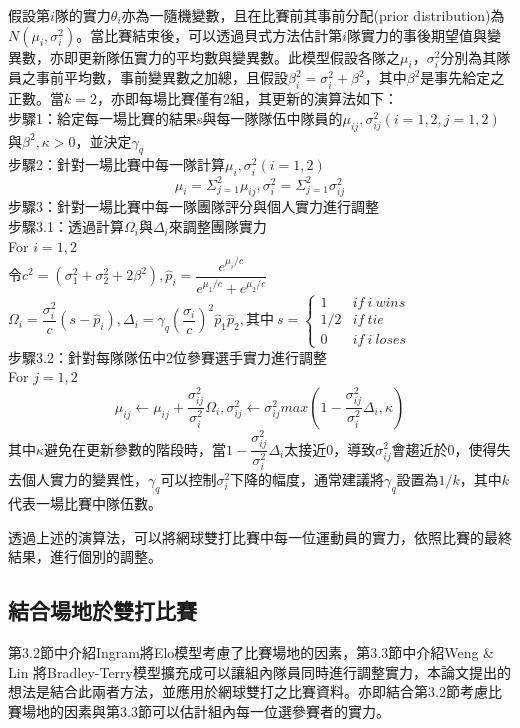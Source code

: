 \documentclass[12pt]{article}
\begin{document}
假設第$i$隊的實力$\theta_i$亦為一隨機變數，且在比賽前其事前分配(prior distribution)為$N(\mu_i,\sigma^2_i)$。當比賽結束後，可以透過貝式方法估計第$i$隊實力的事後期望值與變異數，亦即更新隊伍實力的平均數與變異數。此模型假設各隊之$\mu_i$，$\sigma^2_i$分別為其隊員之事前平均數，事前變異數之加總，且假設$\beta^2_i = \sigma^2_i + \beta^2$，其中$\beta^2$是事先給定之正數。當$k =2$，亦即每場比賽僅有2組，其更新的演算法如下：
\\
步驟1：給定每一場比賽的結果s與每一隊隊伍中隊員的$\mu_{ij},\sigma^2_{ij}(i=1,2,j=1,2)$與$\beta^2,\kappa > 0$，並決定$\gamma_q$
\\
步驟2：針對一場比賽中每一隊計算$\mu_i,\sigma^2_i(i=1,2)$
\[
\mu_i = \Sigma^{2}_{j=1}\mu_{ij}, \sigma^2_i = \Sigma^{2}_{j=1}\sigma^2_{ij}
\]
步驟3：針對一場比賽中每一隊團隊評分與個人實力進行調整
\\
步驟3.1：透過計算$\Omega_i$與$\Delta_i$來調整團隊實力
\\
For $i =1,2$
\\
令$c^2 = (\sigma^2_1+\sigma^2_2+2\beta^2),\hat{p}_{i} = \dfrac{e^{\mu_i/c}}{e^{\mu_1/c} + e^{\mu_2/c}}$
\\
$
\Omega_i = \dfrac{\sigma^2_i}{c}(s-\hat{p}_{i}), \Delta_i = \gamma_q (\dfrac{\sigma_i}{c})^2 \hat{p}_{1} \hat{p}_{2},$其中$\  s = \begin{cases} 1 & if\  i \ wins \\ 1/2 & if\  tie \\ 0 & if\  i \ loses \end{cases}
$
\\
步驟3.2：針對每隊隊伍中2位參賽選手實力進行調整
\\
For $j = 1,2$
\[
\mu_{ij} \leftarrow \mu_{ij} + \dfrac{\sigma^2_{ij}}{\sigma^2_i}\Omega_i , \sigma^2_{ij} \leftarrow \sigma^2_{ij} max(1-\dfrac{\sigma^2_{ij}}{\sigma^2_i}\Delta_i,\kappa)
\] 
其中$\kappa$避免在更新參數的階段時，當$1-\dfrac{\sigma^2_{ij}}{\sigma^2_i}\Delta_i$太接近0，導致$\sigma^2_{ij}$會趨近於0，使得失去個人實力的變異性，$\gamma_q$可以控制$\sigma^2_{i}$下降的幅度，通常建議將$\gamma_q$設置為$1/k$，其中$k$代表一場比賽中隊伍數。

透過上述的演算法，可以將網球雙打比賽中每一位運動員的實力，依照比賽的最終結果，進行個別的調整。

\subsection{結合場地於雙打比賽}

第3.2節中介紹Ingram\cite{Ingram+2021}將Elo模型考慮了比賽場地的因素，第3.3節中介紹Weng \& Lin \cite{JMLR:v12:weng11a}將Bradley-Terry模型擴充成可以讓組內隊員同時進行調整實力，本論文提出的想法是結合此兩者方法，並應用於網球雙打之比賽資料。亦即結合第3.2節考慮比賽場地的因素與第3.3節可以估計組內每一位選參賽者的實力。
\end{document}
